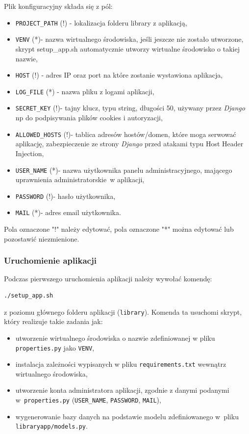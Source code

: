 \documentclass[twoside]{projektInzynierskiMS}
\begin{document}
Plik konfiguracyjny składa się z pól:
\begin{itemize}
	\item \verb`PROJECT_PATH` (!) - lokalizacja folderu library z aplikacją,
	\item \verb`VENV` (*)- nazwa wirtualnego środowiska, jeśli jeszcze nie zostało utworzone, skrypt setup\_app.sh automatycznie utworzy wirtualne środowisko o takiej nazwie,
	\item \verb`HOST` (!) - adres IP oraz port na które zostanie wystawiona aplikacja,
	\item \verb`LOG_FILE` (*) - nazwa pliku z logami aplikacji,
	\item \verb`SECRET_KEY` (!)- tajny klucz, typu string, długości 50, używany przez \textit{Django} np do podpisywania plików cookies i autoryzacji,
	\item \verb`ALLOWED_HOSTS` (!)- tablica adresów hostów/domen, które moga serwować aplikację, zabezpieczenie ze strony \textit{Django} przed atakami typu Host Header Injection,
	\item \verb`USER_NAME` (*)- nazwa użytkownika panelu administracyjnego, mającego uprawnienia administratorskie~w aplikacji,
	\item \verb`PASSWORD` (!)- hasło użytkownika,
	\item \verb`MAIL` (*)- adres email użytkownika.
\end{itemize}

Pola oznaczone "!" należy edytować, pola oznaczone "*" można edytować lub pozostawić niezmienione.

\subsubsection{Uruchomienie aplikacji}
Podczas pierwszego uruchomienia aplikacji należy wywołać komendę:
\begin{verbatim}
./setup_app.sh
\end{verbatim}
z poziomu głównego folderu aplikacji (\verb`library`). Komenda ta usuchomi skrypt, który realizuje takie zadania jak:
\begin{itemize}
	\item utworzenie wirtualnego środowiska o nazwie zdefiniowanej w pliku \verb`properties.py` jako \verb`VENV`,
	\item instalacja zależności wypisanych w pliku \verb`requirements.txt` wewnątrz wirtualnego środowiska,
	\item utworzenie konta administratora aplikacji, zgodnie z danymi podanymi w~\verb`properties.py` (\verb`USER_NAME`, \verb`PASSWORD`, \verb`MAIL`),
	\item wygenerowanie bazy danych na podstawie modelu zdefiniowanego w~pliku \verb`libraryapp/models.py`.
\end{itemize}
\end{document}
